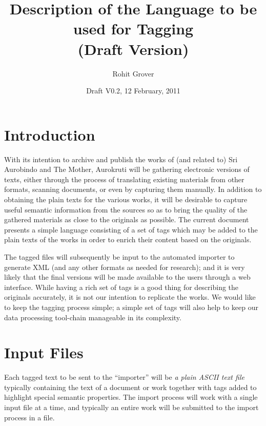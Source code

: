 \documentclass[11pt]{article}
\title{Description of the Language to be used for Tagging\\(Draft Version)}
\author{Rohit Grover}
\date{Draft V0.2, 12 February, 2011}
\begin{document}
\maketitle

\newpage

\tableofcontents

\newpage

\section{Introduction}

\noindent With its intention to archive and publish the works of (and
related to) Sri Aurobindo and The Mother, Aurokruti will be gathering
electronic versions of texts, either through the process of
translating existing materials from other formats, scanning documents,
or even by capturing them manually. In addition to obtaining the plain
texts for the various works, it will be desirable to capture useful
semantic information from the sources so as to bring the quality of
the gathered materials as close to the originals as possible. The
current document presents a simple language consisting of a set of
tags which may be added to the plain texts of the works in order to
enrich their content based on the originals.

The tagged files will subsequently be input to the automated importer
to generate XML (and any other formats as needed for research); and it
is very likely that the final versions will be made available to the
users through a web interface. While having a rich set of tags is a
good thing for describing the originals accurately, it is not our
intention to replicate the works. We would like to keep the tagging
process simple; a simple set of tags will also help to keep our data
processing tool-chain manageable in its complexity.



\section{Input Files}

Each tagged text to be sent to the ``importer'' will be \emph{a plain
  ASCII text file} typically containing the text of a document or work
together with tags added to highlight special semantic properties.
The import process will work with a single input file at a time, and
typically an entire work will be submitted to the import process in a
file.
\end{document}
